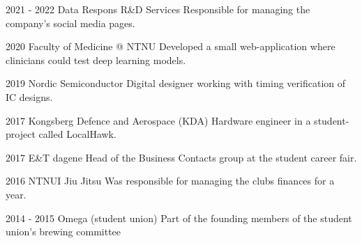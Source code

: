 

\begin{cvSmallExps}
  \cvSmallExp
    {2021 - 2022} %
    {Data Respons R\&D Services} %
    {Responsible for managing the company's social media pages.} %

\cvSmallExp
    {2020} %
    {Faculty of Medicine @ NTNU} %
    {Developed a small web-application where clinicians could test deep learning models.} %

\cvSmallExp
    {2019} %
    {Nordic Semiconductor} %
    {Digital designer working with timing verification of IC designs.} %

  \cvSmallExp
    {2017} %
    {Kongsberg Defence and Aerospace (KDA)} %
    {Hardware engineer in a student-project called LocalHawk.} %

\end{cvSmallExps}


\begin{cvSmallExps}
  \cvSmallExp
    {2017} %
    {E\&T dagene} %
    {Head of the Business Contacts group at the student career fair.} %

\cvSmallExp
    {2016} %
    {NTNUI Jiu Jitsu} %
    {Was responsible for managing the clubs finances for a year.} %

  \cvSmallExp
    {2014 - 2015} %
    {Omega (student union)} %
    {Part of the founding members of the student union's brewing committee} %

\end{cvSmallExps}